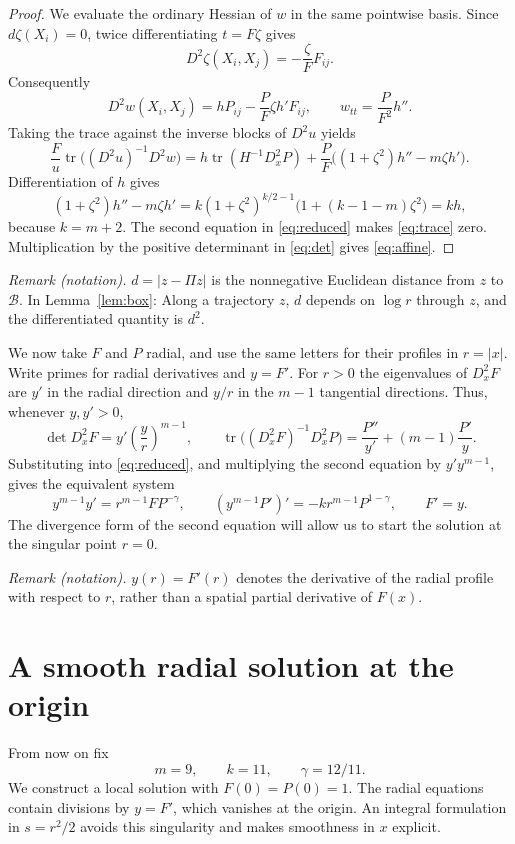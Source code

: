 \documentclass[11pt]{article}
\DeclareMathOperator{\tr}{tr}
\theoremstyle{remark}
\begin{document}
\begin{proof}
We evaluate the ordinary Hessian of $w$ in the same pointwise basis.
Since $d\zeta(X_i)=0$, twice differentiating $t=F\zeta$ gives
\[
 D^2\zeta(X_i,X_j)=-\frac\zeta F F_{ij}.
\]
Consequently
\[
 D^2w(X_i,X_j)=hP_{ij}-\frac PF\zeta h'F_{ij},
 \qquad w_{tt}=\frac P{F^2}h''.
\]
Taking the trace against the inverse blocks of $D^2u$ yields
\begin{equation}\label{eq:trace}
 \frac Fu\tr\bigl((D^2u)^{-1}D^2w\bigr)
 =h\tr(H^{-1}D_x^2P)
  +\frac PF\bigl((1+\zeta^2)h''-m\zeta h'\bigr).
\end{equation}
Differentiation of $h$ gives
\[
 (1+\zeta^2)h''-m\zeta h'
 =k(1+\zeta^2)^{k/2-1}
       \bigl(1+(k-1-m)\zeta^2\bigr)=kh,
\]
because $k=m+2$.  The second equation in \eqref{eq:reduced}
makes \eqref{eq:trace} zero.  Multiplication by the positive
determinant in \eqref{eq:det} gives \eqref{eq:affine}.
\end{proof}

\noindent\textit{Remark (notation).} $d=|z-\Pi z|$ is the nonnegative Euclidean distance from $z$ to $\mathcal B$. In Lemma~\ref{lem:box}: Along a trajectory $z$, $d$ depends on $\log r$ through $z$, and the differentiated quantity is $d^2$.


We now take $F$ and $P$ radial, and use the same letters for their
profiles in $r=|x|$.  Write primes for radial derivatives and
$y=F'$.  For $r>0$ the eigenvalues of $D_x^2F$ are $y'$ in the
radial direction and $y/r$ in the $m-1$ tangential directions.
Thus, whenever $y,y'>0$,
\[
 \det D_x^2F=y'\left(\frac yr\right)^{m-1},\qquad
 \tr\bigl((D_x^2F)^{-1}D_x^2P\bigr)
 =\frac{P''}{y'}+(m-1)\frac{P'}y.
\]
Substituting into \eqref{eq:reduced}, and multiplying the second
equation by $y'y^{m-1}$, gives the equivalent system
\begin{equation}\label{eq:radial}
 y^{m-1}y'=r^{m-1}FP^{-\gamma},\qquad
 (y^{m-1}P')'=-k r^{m-1}P^{1-\gamma},\qquad F'=y.
\end{equation}
The divergence form of the second equation will allow us to start
the solution at the singular point $r=0$.

\noindent\textit{Remark (notation).} $y(r)=F'(r)$ denotes the derivative of the radial profile with respect to $r$, rather than a spatial partial derivative of $F(x)$.


\section{A smooth radial solution at the origin}\label{sec:local}
From now on fix
\begin{equation}\label{eq:constants}
 m=9,\qquad k=11,\qquad \gamma=12/11.
\end{equation}
We construct a local solution with $F(0)=P(0)=1$.
The radial equations contain divisions by $y=F'$, which vanishes
at the origin.  An integral formulation in $s=r^2/2$ avoids this
singularity and makes smoothness in $x$ explicit.
\end{document}
